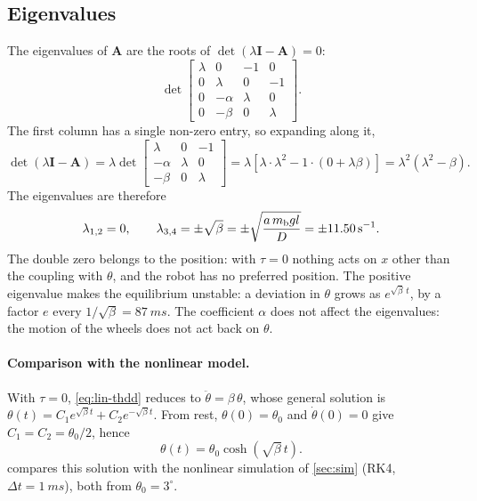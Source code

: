 \subsection{Eigenvalues}

The eigenvalues of $\bm A$ are the roots of $\det(\lambda\bm I - \bm A) = 0$:
\begin{equation}
  \det\begin{bmatrix}
    \lambda & 0 & -1 & 0 \\
    0 & \lambda & 0 & -1 \\
    0 & -\alpha & \lambda & 0 \\
    0 & -\beta & 0 & \lambda
  \end{bmatrix} .
\end{equation}
The first column has a single non-zero entry, so expanding along it,
\begin{equation}
  \det(\lambda\bm I - \bm A)
  = \lambda \det\begin{bmatrix}
    \lambda & 0 & -1 \\
    -\alpha & \lambda & 0 \\
    -\beta & 0 & \lambda
  \end{bmatrix}
  = \lambda\left[\lambda\cdot\lambda^2 - 1\cdot\left(0 + \lambda\beta\right)\right]
  = \lambda^2\left(\lambda^2 - \beta\right) .
\end{equation}
The eigenvalues are therefore
\begin{equation}
  \lambda_{1,2} = 0, \qquad \lambda_{3,4} = \pm\sqrt{\beta} = \pm\sqrt{\frac{a\,m_{\mathrm b} g l}{D}} = \pm\SI{11.50}{s^{-1}} .
\end{equation}
The double zero belongs to the position: with $\tau = 0$ nothing acts on $x$
other than the coupling with $\theta$, and the robot has no preferred position.
The positive eigenvalue makes the equilibrium unstable: a deviation in
$\theta$ grows as $e^{\sqrt\beta\,t}$, by a factor $e$ every
$1/\sqrt\beta = \SI{87}{ms}$. The coefficient $\alpha$ does not affect the
eigenvalues: the motion of the wheels does not act back on $\theta$.

\paragraph{Comparison with the nonlinear model.} With $\tau = 0$,
\cref{eq:lin-thdd} reduces to $\ddot\theta = \beta\,\theta$, whose general
solution is $\theta(t) = C_1 e^{\sqrt\beta t} + C_2 e^{-\sqrt\beta t}$. From rest,
$\theta(0) = \theta_0$ and $\dot\theta(0) = 0$ give $C_1 = C_2 = \theta_0/2$,
hence
\begin{equation}
  \theta(t) = \theta_0\cosh\!\left(\sqrt\beta\, t\right) .
\end{equation}
 compares this solution with the nonlinear simulation of
\cref{sec:sim} (RK4, $\Delta t = \SI{1}{ms}$), both from $\theta_0 = 3^\circ$.

